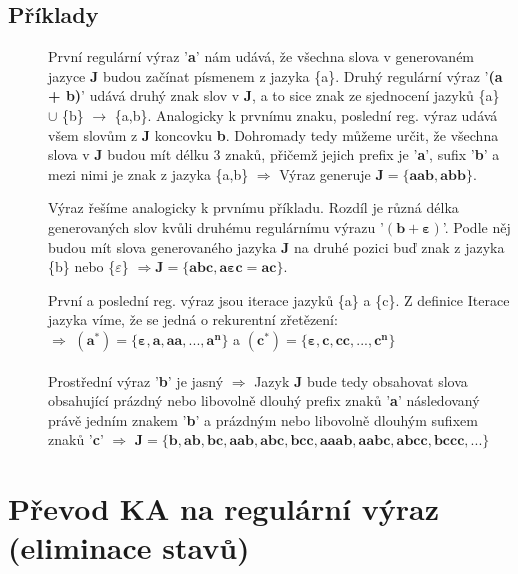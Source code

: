 \documentclass{report}
\begin{document}
\subsection*{Příklady}
\begin{description}
    \item[] První regulární výraz '\textbf{a}' nám udává, že všechna slova v generovaném jazyce \textbf{J} budou začínat písmenem z jazyka \{a\}. Druhý regulární výraz '\textbf{(a + b)}' udává druhý znak slov v \textbf{J}, a to sice znak ze sjednocení jazyků \{a\} $\cup$ \{b\} $\rightarrow$ \{a,b\}. Analogicky k prvnímu znaku, poslední reg. výraz udává všem slovům z \textbf{J} koncovku \textbf{b}. Dohromady tedy můžeme určit, že všechna slova v \textbf{J} budou mít délku 3 znaků, přičemž jejich prefix je '\textbf{a}', sufix '\textbf{b}' a mezi nimi je znak z jazyka \{a,b\} $\Rightarrow$ Výraz generuje $\mathbf{J = \{aab,abb\}}$.
    \item[] Výraz řešíme analogicky k prvnímu příkladu. Rozdíl je různá délka generovaných slov kvůli druhému regulárnímu výrazu '$\mathbf{(b+\varepsilon)}$'. Podle něj budou mít slova generovaného jazyka \textbf{J} na druhé pozici buď znak z jazyka \{b\} nebo \{$\varepsilon$\} $\Rightarrow \mathbf{J = \{abc, a{\varepsilon}c = ac\}}$.
    \item[] První a poslední reg. výraz jsou iterace jazyků \{a\} a \{c\}. Z definice Iterace jazyka víme, že se jedná o rekurentní zřetězení:\\ 
    $\Rightarrow$ $\mathbf{(a^*) = \{\varepsilon, a, aa, ..., a^n\}}$ a $\mathbf{(c^*)=\{\varepsilon, c, cc, ..., c^n\}}$
    \\ \\ Prostřední výraz '\textbf{b}' je jasný $\Rightarrow$ Jazyk \textbf{J} bude tedy obsahovat slova obsahující prázdný nebo libovolně dlouhý prefix znaků '\textbf{a}' následovaný právě jedním znakem '\textbf{b}' a prázdným nebo libovolně dlouhým sufixem znaků '\textbf{c}' $\Rightarrow$ $\mathbf{J=\{b,ab,bc,aab,abc,bcc,aaab,aabc,abcc,bccc,...\}}$
\end{description}

\section{Převod KA na regulární výraz (eliminace stavů)}
\end{document}
